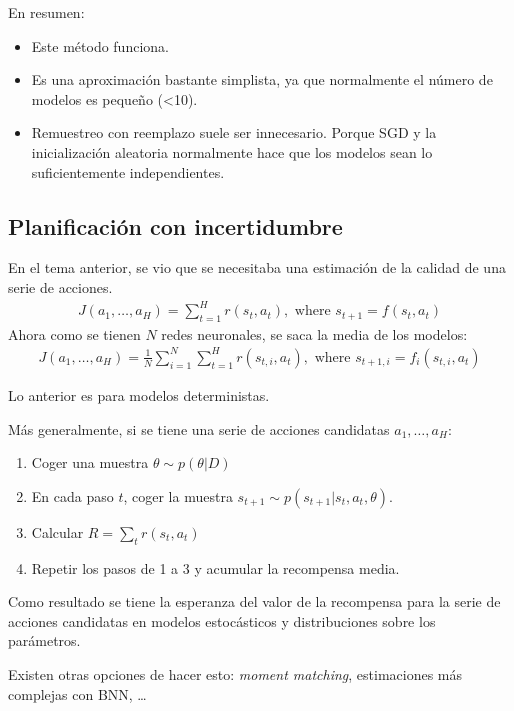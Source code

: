 En resumen:
\begin{itemize}
    \item Este método funciona.
    \item Es una aproximación bastante simplista, ya que normalmente el número de modelos es
        pequeño (<10).
    \item Remuestreo con reemplazo suele ser innecesario. Porque SGD y la inicialización
        aleatoria normalmente hace que los modelos sean lo suficientemente independientes.
\end{itemize}

\subsection{Planificación con incertidumbre}%
\label{sub:planificación_con_incertidumbre}

En el tema anterior, se vio que se necesitaba una estimación de la calidad de una serie de
acciones.
\begin{align}
J ( a _ { 1 } , \ldots , a _ { H } ) = \sum _ { t = 1 } ^ { H } r ( s _ { t } , a _ { t } ) , \text { where } s _ { t + 1 } = f ( s _ { t } , a _ { t } )
\end{align}
Ahora como se tienen $N$ redes neuronales, se saca la media de los modelos:
\begin{align}
J ( a _ { 1 } , \ldots , a _ { H } ) = \frac { 1 } { N } \sum _ { i = 1 } ^ { N } \sum _ { t = 1 } ^ { H } r ( s _ { t , i } , a _ { t } ) , \text { where } s _ { t + 1 , i } = f _ { i } ( s _ { t , i } , a _ { t } )
\end{align}

Lo anterior es para modelos deterministas.

Más generalmente, si se tiene una serie de acciones candidatas $ a_1,\ldots,a_H$:
\begin{enumerate}
    \item Coger una muestra $\theta \sim p(\theta|D)$ 
    \item En cada paso $t$, coger la muestra $s_{t+1}\sim p(s_{t+1}|s_t,a_t,\theta)$.
    \item Calcular $R=\sum_t r(s_t,a_t)$
    \item Repetir los pasos de 1 a 3 y acumular la recompensa media.
\end{enumerate}
Como resultado se tiene la esperanza del valor de la recompensa para la serie de acciones
candidatas en modelos estocásticos y distribuciones sobre los parámetros.

Existen otras opciones de hacer esto: \textit{moment matching}, estimaciones más complejas con
BNN, \ldots

